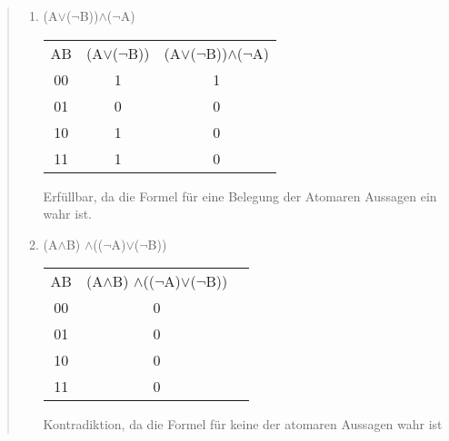 \begin{quote}
\begin{enumerate}[label = {$\Phi$\textsubscript{\arabic*} =}]
        \item (A$\vee$($\neg$B))$\wedge$($\neg$A)\\
            {\tiny
            \begin{tabular}{ccc}
                AB & (A$\vee$($\neg$B)) & (A$\vee$($\neg$B))$\wedge$($\neg$A)\\
                00 & 1 & 1\\
                01 & 0 & 0\\
                10 & 1 & 0\\
                11 & 1 & 0\\
            \end{tabular}
            Erfüllbar, da die Formel für eine Belegung der Atomaren Aussagen ein wahr
            ist.}
        \item (A$\wedge$B) $\wedge$(($\neg$A)$\vee$($\neg$B))\\
            {\tiny
            \begin{tabular}{ccc}
                AB & (A$\wedge$B) $\wedge$(($\neg$A)$\vee$($\neg$B))\\
                00 & 0 \\
                01 & 0 \\
                10 & 0 \\
                11 & 0 \\
            \end{tabular}
            Kontradiktion, da die Formel für keine der atomaren Aussagen wahr ist}
    \end{enumerate}
\end{quote}
\newpage
